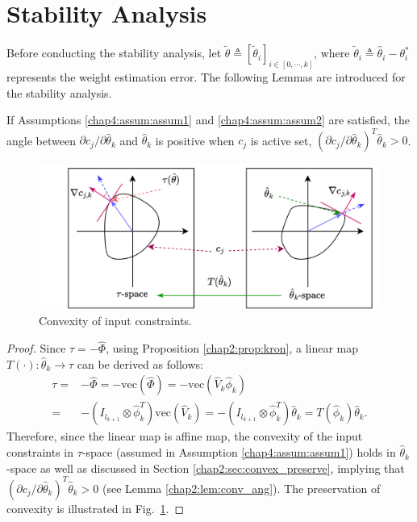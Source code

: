 \section{Stability Analysis} 

Before conducting the stability analysis, let $\tilde\theta\triangleq [\tilde\theta_i]_{i\in[0,\cdots,k]}$, where $\tilde\theta_i\triangleq\hat\theta_i-\theta^*_i$ represents the weight estimation error. 
The following Lemmas are introduced for the stability analysis. %
\begin{lemma}
    If Assumptions \ref{chap4:assum:assum1} and \ref{chap4:assum:assum2} are satisfied, the angle between $\partial c_j/\partial \hat\theta_k$ and $\hat\theta_k$ is positive when $c_j$ is active set, \ie $(\partial c_j/\partial \hat\theta_k)^T\hat\theta_k>0$.
    \label{chap4:lem:lem1}
\end{lemma}

\begin{figure}[!t]
   \centering
   \includegraphics[width=.9\linewidth]{imgs/spaces.drawio.png}
   \caption{Convexity of input constraints.}
   \label{chap4:fig:spaces}
\end{figure}

\begin{proof}

Since $\tau = -\hat\Phi$, using Proposition \ref{chap2:prop:kron}, a linear map $T(\cdot):\hat\theta_k\to\tau$ can be derived as follows: 
\begin{equation}
    \begin{aligned}
    \tau = &-\hat\Phi = -\text{vec}(\hat\Phi)     
    = -\text{vec}(\hat V_k \hat\phi_k) 
    \\
    = & -(I_{l_{k+1}}\otimes \hat\phi_k^T)\text{vec}(\hat V_k)
    =-(I_{l_{k+1}}\otimes \hat\phi_k^T)\hat\theta_k = T(\hat\phi_k) \hat\theta_k
    .
    \end{aligned}
    \label{chap4:eq:linear map}
\end{equation}
Therefore, since the linear map is affine map, the convexity of the input constraints in $\tau$-space (assumed in Assumption \ref{chap4:assum:assum1}) holds in $\hat\theta_k$-space as well as discussed in Section \ref{chap2:sec:convex_preserve}, implying that $(\partial c_j/\partial \hat\theta_k)^T\hat\theta_k>0$ (see Lemma \ref{chap2:lem:conv_ang}).
The preservation of convexity is illustrated in Fig.~\ref{chap4:fig:spaces}.

\end{proof}

